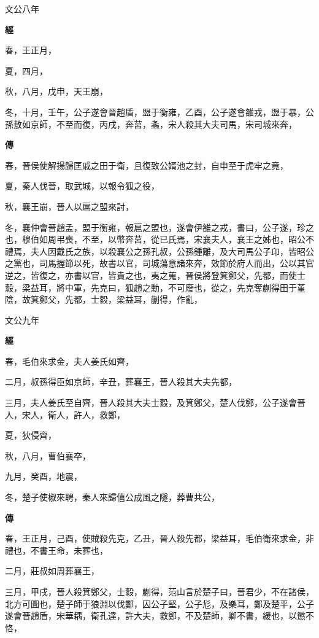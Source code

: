 \documentclass{ctexart}
\begin{document}
文公八年


\textbf{經}



春，王正月，

夏，四月，

秋，八月，戊申，天王崩，

冬，十月，壬午，公子遂會晉趙盾，盟于衡雍，乙酉，公子遂會雒戎，盟于暴，公孫敖如京師，不至而復，丙戌，奔莒，螽，宋人殺其大夫司馬，宋司城來奔，

\textbf{傳}



春，晉侯使解揚歸匡戚之田于衛，且復致公婿池之封，自申至于虎牢之竟，

夏，秦人伐晉，取武城，以報令狐之役，

秋，襄王崩，晉人以扈之盟來討，

冬，襄仲會晉趙孟，盟于衡雍，報扈之盟也，遂會伊雒之戎，書曰，公子遂，珍之也，穆伯如周弔喪，不至，以幣奔莒，從已氏焉，宋襄夫人，襄王之姊也，昭公不禮焉，夫人因戴氏之族，以殺襄公之孫孔叔，公孫鍾離，及大司馬公子卬，皆昭公之黨也，司馬握節以死，故書以官，司城蕩意諸來奔，效節於府人而出，公以其官逆之，皆復之，亦書以官，皆貴之也，夷之蒐，晉侯將登箕鄭父，先都，而使士縠，梁益耳，將中軍，先克曰，狐趙之勳，不可廢也，從之，先克奪蒯得田于堇陰，故箕鄭父，先都，士縠，梁益耳，蒯得，作亂，





文公九年


\textbf{經}



春，毛伯來求金，夫人姜氏如齊，

二月，叔孫得臣如京師，辛丑，葬襄王，晉人殺其大夫先都，

三月，夫人姜氏至自齊，晉人殺其大夫士縠，及箕鄭父，楚人伐鄭，公子遂會晉人，宋人，衛人，許人，救鄭，

夏，狄侵齊，

秋，八月，曹伯襄卒，

九月，癸酉，地震，

冬，楚子使椒來聘，秦人來歸僖公成風之隧，葬曹共公，

\textbf{傳}



春，王正月，己酉，使賊殺先克，乙丑，晉人殺先都，梁益耳，毛伯衛來求金，非禮也，不書王命，未葬也，

二月，莊叔如周葬襄王，

三月，甲戌，晉人殺箕鄭父，士縠，蒯得，范山言於楚子曰，晉君少，不在諸侯，北方可圖也，楚子師于狼淵以伐鄭，囚公子堅，公子尨，及樂耳，鄭及楚平，公子遂會晉趙盾，宋華耦，衛孔達，許大夫，救鄭，不及楚師，卿不書，緩也，以懲不恪，
\end{document}
